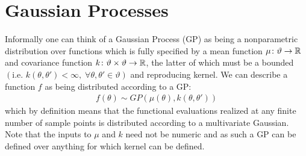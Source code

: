
\section{Gaussian Processes}
\label{sec:opt:GPs}

Informally one can think of a Gaussian Process (GP) \citep{rasmussen2006gaussian} as being a nonparametric distribution over functions which is fully specified by a mean function $\mu \colon \vartheta \rightarrow \mathbb{R}$ and covariance function $k \colon \vartheta \times \vartheta \rightarrow \mathbb{R}$, the latter of which must be a bounded $\left(\text{i.e. }k\left(\theta,\theta'\right)<\infty, \; \forall \theta,\theta' \in \vartheta\right)$ and reproducing kernel.  We can describe a function $f$ as being distributed according to a GP:
\begin{align}
\label{eq:GP}
f \left(\theta\right) \sim GP \left(\mu\left(\theta\right), k\left(\theta,\theta'\right)\right)
\end{align}
which by definition means that the functional evaluations realized at any finite number of sample points is distributed according to a multivariate Gaussian. Note that the inputs to $\mu$ and $k$ need not be numeric and as such a GP can be defined over anything for which kernel can be defined.

